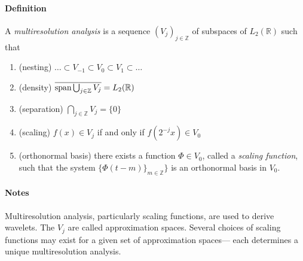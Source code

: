 \documentclass[12pt]{article}
\begin{document}

\paragraph{Definition} 
A \emph{multiresolution analysis} is a sequence $(V_j)_{j\in \mathbb Z}$ of subspaces of $L_2({\mathbb R})$ such that
\begin{enumerate}
\item (nesting) $ \ldots \subset V_{-1} \subset V_0 \subset V_1 \subset \ldots $
\item (density) $\overline{\mathop{\rm span} \bigcup_{j \in \mathbb Z} V_j } = L_2({\mathbb R}) $ 
\item (separation) $ \bigcap_{j \in \mathbb Z} V_j = \{0\}$
\item (scaling) $f(x) \in V_j$ if and only if $f(2^{-j} x) \in V_0$
\item (orthonormal basis) there exists a function $\Phi \in V_0$, called a \emph{scaling function}, such that the system $\{ \Phi(t -m) \}_{m \in \mathbb Z} \}$ is an orthonormal basis in $V_0.$
\end{enumerate}

\paragraph{Notes}
Multiresolution analysis, particularly scaling functions, are used to derive wavelets. The $V_j$ are called approximation spaces. Several choices of scaling functions may exist for a given set of approximation spaces--- each determines a unique multiresolution analysis.
\end{document}
